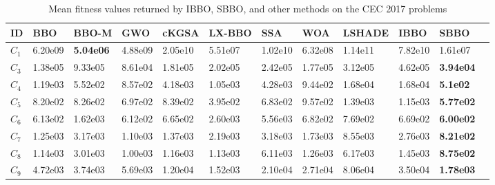 \begin{table}[h]
\scriptsize
\caption[Mean fitness values returned by IBBO, SBBO, and other methods on the CEC 2017 benchmark problems]{\fontsize{10}{12} \selectfont Mean fitness values returned by IBBO, SBBO, and other methods on the CEC 2017 problems}
\begin{center}
\renewcommand{\arraystretch}{1.4}
\begin{tabular}{p{0.3in} | p{0.44in} | p{0.4in} |  p{0.5in} |  p{0.4in}|  p{0.5in} |  p{0.4in} | p{0.4in} |  p{0.4in} | p{0.4in} |  p{0.4in} |  p{0.4in}}
\hline
\textbf{ID}     &     \textbf{BBO}     &     \textbf{BBO-M}     &    \textbf{GWO}     &    \textbf{cKGSA}    &     \textbf{LX-BBO}     &    \textbf{SSA}    &    \textbf{WOA}     &    \textbf{LSHADE}     &     \textbf{IBBO}     &    \textbf{SBBO}\\
\hline                                                                                
$C_1$     &    6.20e09    &    \textbf{5.04e06 }    &    4.88e09    &    2.05e10    &    5.51e07    &    1.02e10    &    6.32e08    &    1.14e11    &    7.82e10    &     1.61e07 \\
$C_3$     &    1.38e05    &    9.33e05    &    8.61e04    &    1.81e05    &    2.02e05    &    2.42e05    &    1.77e05    &    3.12e05    &    4.62e05    &    \textbf{3.94e04 }\\
\hline
$C_4$     &    1.19e03    &    5.52e02    &    8.57e02    &    4.18e03    &    1.05e03    &    4.28e03    &    9.44e02    &    1.68e04    &    1.68e04    &    \textbf{5.1e02 }\\
$C_5$     &    8.20e02    &    8.26e02    &    6.97e02    &    8.39e02    &    3.95e02    &    6.83e02    &    9.57e02    &    1.39e03    &    1.15e03    &    \textbf{5.77e02 }\\
$C_6$     &    6.13e02    &    1.62e03    &    6.12e02    &    6.65e02    &    2.60e03    &    5.56e03    &    6.82e02    &    7.69e02    &    6.69e02    &    \textbf{6.00e02 }\\
$C_7$     &    1.25e03    &    3.17e03    &    1.10e03    &    1.37e03    &    2.19e03    &    3.18e03    &    1.73e03    &    8.55e03    &    2.76e03    &    \textbf{8.21e02 }\\
$C_8$     &    1.14e03    &    3.01e03    &    1.00e03    &    1.16e03    &    1.13e03    &    6.11e03    &    1.26e03    &    6.17e03    &    1.45e03    &    \textbf{8.75e02 }\\
$C_9$     &    4.72e03    &    3.74e03    &    5.69e03    &    1.20e04    &    1.52e03    &    2.10e04    &    2.71e04    &    8.06e04    &    3.50e04    &    \textbf{1.78e03 }\\

\end{tabular}
\end{center}
\end{table}
